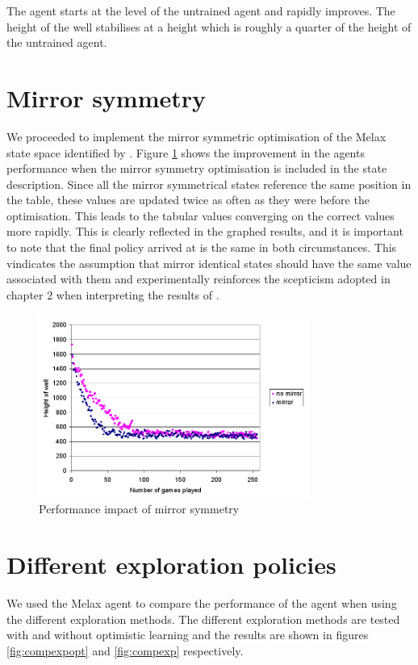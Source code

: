 \documentclass{rucsthesis}
\begin{document}
The agent starts at the level of the untrained agent and rapidly improves. The height of the well stabilises at a height which is roughly a quarter of the height of the untrained agent.

\section{Mirror symmetry}

We proceeded to implement the mirror symmetric optimisation of the Melax state space identified by \cite{yaeltetris}. Figure \ref{fig:comparemelax} shows the improvement in the agents performance when the mirror symmetry optimisation is included in the state description. Since all the mirror symmetrical states reference the same position in the table, these values are updated twice as often as they were before the optimisation. This leads to the tabular values converging on the correct values more rapidly. This is clearly reflected in the graphed results, and it is important to note that the final policy arrived at is the same in both circumstances. This vindicates the assumption that mirror identical states should have the same value associated with them and experimentally reinforces the scepticism adopted in chapter 2 when interpreting the results of \cite{yaeltetris}. 

\begin{figure}[h]
\centering
\includegraphics[width=3.5in]{mirrormelax.png}
\caption{Performance impact of mirror symmetry}
\label{fig:comparemelax}
\end{figure}

\section{Different exploration policies}

We used the Melax agent to compare the performance of the agent when using the different exploration methods. The different exploration methods are tested with and without optimistic learning and the results are shown in figures \ref{fig:compexpopt} and \ref{fig:compexp} respectively.
\end{document}
